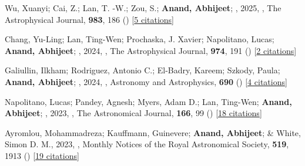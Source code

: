 \item[{\color{numcolor}\scriptsize5}] Wu, Xuanyi; Cai, Z.; Lan, T. -W.; Zou, S.; \textbf{Anand, Abhijeet}; \etal, 2025, , The Astrophysical Journal, \textbf{983}, 186 () [\href{https://ui.adsabs.harvard.edu/abs/2025ApJ...983..186W}{5 citations}]

\item[{\color{numcolor}\scriptsize4}] Chang, Yu-Ling; Lan, Ting-Wen; Prochaska, J. Xavier; Napolitano, Lucas; \textbf{Anand, Abhijeet}; \etal, 2024, , The Astrophysical Journal, \textbf{974}, 191 () [\href{https://ui.adsabs.harvard.edu/abs/2024ApJ...974..191C}{2 citations}]

\item[{\color{numcolor}\scriptsize3}] Galiullin, Ilkham; Rodriguez, Antonio C.; El-Badry, Kareem; Szkody, Paula; \textbf{Anand, Abhijeet}; \etal, 2024, , Astronomy and Astrophysics, \textbf{690} () [\href{https://ui.adsabs.harvard.edu/abs/2024A&A...690A.374G}{4 citations}]

\item[{\color{numcolor}\scriptsize2}] Napolitano, Lucas; Pandey, Agnesh; Myers, Adam D.; Lan, Ting-Wen; \textbf{Anand, Abhijeet}; \etal, 2023, , The Astronomical Journal, \textbf{166}, 99 () [\href{https://ui.adsabs.harvard.edu/abs/2023AJ....166...99N}{18 citations}]

\item[{\color{numcolor}\scriptsize1}] Ayromlou, Mohammadreza; Kauffmann, Guinevere; \textbf{Anand, Abhijeet}; \& White, Simon D. M., 2023, , Monthly Notices of the Royal Astronomical Society, \textbf{519}, 1913 () [\href{https://ui.adsabs.harvard.edu/abs/2023MNRAS.519.1913A}{19 citations}]